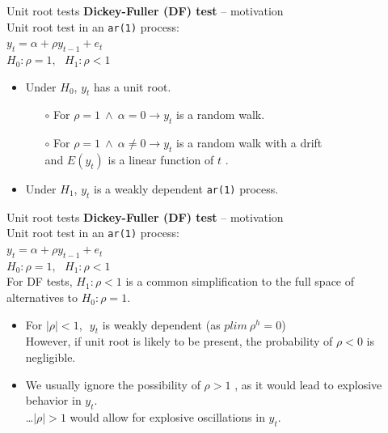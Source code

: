 \documentclass{beamer}
\begin{document}
\begin{frame}{Unit root tests}
\textbf{Dickey-Fuller (DF) test} – motivation \\
\medskip
Unit root test in an \texttt{ar(1)} process: \\
\medskip
$y_t = \alpha + \rho y_{t-1} + e_t$\\
\medskip
$ H_0 : \rho = 1, \> \> \> H_1 : \rho <1$ \\
\medskip
\begin{itemize}
\item Under $H_0$, $y_t$ has a unit root. 
\begin{itemize}
\item[$\circ$] For  $\rho =1 \ \wedge \ \alpha =0 \rightarrow y_t$     is a random walk.
\item[$\circ$] For  $\rho =1 \ \wedge \ \alpha \neq 0 \rightarrow y_t$     is a random walk with a drift   \\and $E(y_t)$ is a linear function of $t$ .
\end{itemize}
\item Under $H_1$, $y_t$  is a weakly dependent \texttt{ar(1)} process. \\
\bigskip
\end{itemize}
\medskip
\end{frame}
\begin{frame}{Unit root tests}
\textbf{Dickey-Fuller (DF) test} – motivation \\
\medskip
Unit root test in an \texttt{ar(1)} process: \\
\medskip
$y_t = \alpha + \rho y_{t-1} + e_t$\\
\medskip
$ H_0 : \rho = 1, \> \> \> H_1 : \rho <1$ \\
\medskip
For DF tests, $H_1 : \rho <1$ is a common simplification to the full space of alternatives to $H_0: \rho = 1$.
\begin{itemize}
\item For $|\rho|<1$, $\,\, y_t$  is weakly dependent (as $\textit{plim} \> \rho^h=0$)\\
However, if unit root is likely to be present, the probability of $\rho<0$ is negligible.
\item We usually ignore the possibility of $\rho >1$   , as it would lead to explosive behavior in $y_t$. \\
\dots $|\rho|>1$ would allow for explosive oscillations in $y_t$.
\end{itemize}
\end{frame}
\end{document}
